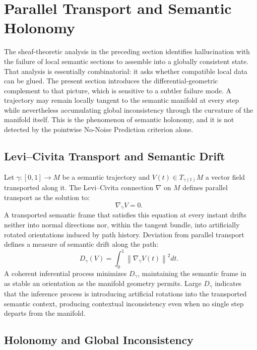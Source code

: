 \documentclass[11pt,a4paper,twocolumn]{article}
\begin{document}
\section{Parallel Transport and Semantic Holonomy}

The sheaf-theoretic analysis in the preceding section identifies
hallucination with the failure of local semantic sections to assemble
into a globally consistent state. That analysis is essentially
combinatorial: it asks whether compatible local data can be glued. The
present section introduces the differential-geometric complement to that
picture, which is sensitive to a subtler failure mode. A trajectory may
remain locally tangent to the semantic manifold at every step while
nevertheless accumulating global inconsistency through the curvature of
the manifold itself. This is the phenomenon of semantic holonomy, and
it is not detected by the pointwise No-Noise Prediction criterion alone.

\subsection{Levi--Civita Transport and Semantic Drift}

Let $\gamma : [0,1] \to M$ be a semantic trajectory and
$V(t) \in T_{\gamma(t)}M$ a vector field transported along it. The
Levi--Civita connection $\nabla$ on $M$ defines parallel transport as
the solution to:
\[
\nabla_{\dot{\gamma}} V = 0.
\]
A transported semantic frame that satisfies this equation at every
instant drifts neither into normal directions nor, within the tangent
bundle, into artificially rotated orientations induced by path history.
Deviation from parallel transport defines a measure of semantic drift
along the path:
\[
D_\gamma(V)
=
\int_0^1
\left\|\nabla_{\dot{\gamma}} V(t)\right\|^2 dt.
\]
A coherent inferential process minimizes $D_\gamma$, maintaining the
semantic frame in as stable an orientation as the manifold geometry
permits. Large $D_\gamma$ indicates that the inference process is
introducing artificial rotations into the transported semantic context,
producing contextual inconsistency even when no single step departs
from the manifold.

\subsection{Holonomy and Global Inconsistency}
\end{document}
